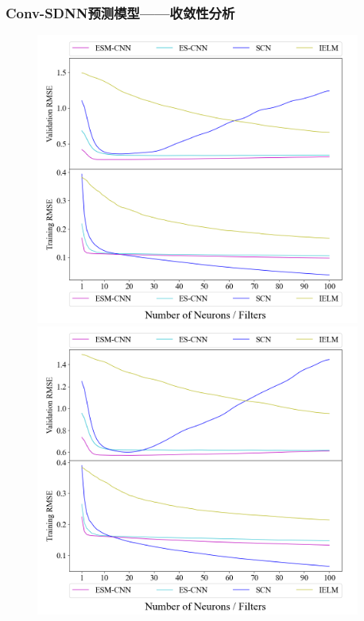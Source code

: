 \begin{frame}
    \frametitle{Conv-SDNN预测模型——收敛性分析}
    \begin{figure}[!t]
        \centering
        \begin{minipage}[b]{0.32\textwidth}
            \includegraphics[width = 0.95\textwidth]{float/ch.cnn/sili_H1_revise.png}
        \end{minipage}
        \begin{minipage}[b]{0.32\textwidth}
            \includegraphics[width = 0.95\textwidth]{float/ch.cnn/sili_H4_revise.png}

\end{minipage}
\end{figure}
\end{frame}
